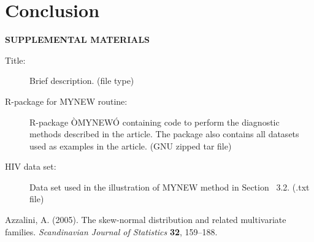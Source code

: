 \documentclass[12pt]{article}
\begin{document}
\section{Conclusion}
\label{sec:conc}


\bigskip
\begin{center}
{\large\bf SUPPLEMENTAL MATERIALS}
\end{center}

\begin{description}

\item[Title:] Brief description. (file type)

\item[R-package for  MYNEW routine:] R-package ÒMYNEWÓ containing code to perform the diagnostic methods described in the article. The package also contains all datasets used as examples in the article. (GNU zipped tar file)

\item[HIV data set:] Data set used in the illustration of MYNEW method in Section~ 3.2. (.txt file)

\end{description}

\begin{thebibliography}{}

Azzalini, A. (2005).
\newblock The skew-normal distribution and related multivariate families.
\newblock \emph{Scandinavian Journal of Statistics} \textbf{32}, 159--188.

\end{thebibliography}{}
\end{document}
